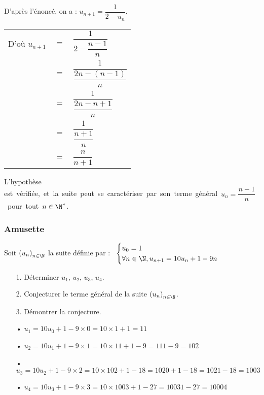 D'après l'énoncé, on a : $u_{n+1} = \dfrac{1}{2 - u_n}$. \\


\begin{tabular}{lll}
D'où $u_{n+1}$ & $ = $ & $ \dfrac{1}{2 - \dfrac{n-1}{n}}$ \vspace*{.3cm}  \\
& $ = $ & $\dfrac{1}{\dfrac{2n - \left(n-1\right)}{n}}$ \vspace*{.3cm} \\
& $=$ & $\dfrac{1}{\dfrac{2n - n + 1}{n}}$ \vspace*{.3cm} \\
& $=$ & $\dfrac{1}{\dfrac{n+1}{n}}$ \vspace*{.3cm} \\
& $=$ & $\dfrac{n}{n+1}$ \vspace*{.3cm} \\
\end{tabular}

\vspace*{.3cm}

L'hypothèse \hbox{est vérifiée, et la suite peut se caractériser par son terme général $u_n = \dfrac{n-1}{n}$ pour tout $n \in \N^*$.}

\newpage
 
\subsubsection{Amusette}

Soit $\left(u_n\right)_{n \in \N}$ la suite définie par :$ \; \; \; \begin{cases}
u_0 = 1 \\
\forall n \in \N, u_{n+1} = 10u_n + 1 - 9n \\
\end{cases}$ \\

\begin{itemize}
\item[1.] Déterminer $u_1$, $u_2$, $u_3$, $u_4$. \\
\item[2.] Conjecturer le terme général de la suite $\left(u_n\right)_{n \in \N}$. \\
\item[3.] Démontrer la conjecture. \\
\end{itemize}

\begin{itemize}
\item[•] $u_1 = 10u_0 + 1 - 9 \times 0 = 10 \times 1 + 1 = 11$ \\
\item[•] $u_2 = 10u_1 + 1 - 9 \times 1 = 10 \times 11 + 1 - 9 = 111 - 9 = 102$ \\
\item[•] $u_3 = 10u_2 + 1 - 9 \times 2 = 10 \times 102 + 1 - 18 = 1020 + 1 - 18 = 1021 - 18 = 1003 $ \\
\item[•] $u_4 = 10u_3 + 1 - 9 \times 3 = 10 \times 1003 + 1 - 27 = 10031 - 27 = 10004$ \\
\end{itemize}


